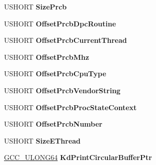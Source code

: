 \begin{DoxyCompactItemize}
U\+S\+H\+O\+RT {\bfseries Size\+Prcb}
\item 
\mbox{\label{struct___k_d_d_e_b_u_g_g_e_r___d_a_t_a64_a4b52d7c1379319af666cc3b134f54955}} 
U\+S\+H\+O\+RT {\bfseries Offset\+Prcb\+Dpc\+Routine}
\item 
\mbox{\label{struct___k_d_d_e_b_u_g_g_e_r___d_a_t_a64_a92a463bfddea18ec7218fb84c51f1bef}} 
U\+S\+H\+O\+RT {\bfseries Offset\+Prcb\+Current\+Thread}
\item 
\mbox{\label{struct___k_d_d_e_b_u_g_g_e_r___d_a_t_a64_af21f607426874dc46d8dc390b48c7b85}} 
U\+S\+H\+O\+RT {\bfseries Offset\+Prcb\+Mhz}
\item 
\mbox{\label{struct___k_d_d_e_b_u_g_g_e_r___d_a_t_a64_a4e484b436407e1cc8079c8a50c7e70c4}} 
U\+S\+H\+O\+RT {\bfseries Offset\+Prcb\+Cpu\+Type}
\item 
\mbox{\label{struct___k_d_d_e_b_u_g_g_e_r___d_a_t_a64_a9267edb48a04bac9f74144adeba09c5f}} 
U\+S\+H\+O\+RT {\bfseries Offset\+Prcb\+Vendor\+String}
\item 
\mbox{\label{struct___k_d_d_e_b_u_g_g_e_r___d_a_t_a64_a8e660e74a4b87af60fb38f8e5cd0335d}} 
U\+S\+H\+O\+RT {\bfseries Offset\+Prcb\+Proc\+State\+Context}
\item 
\mbox{\label{struct___k_d_d_e_b_u_g_g_e_r___d_a_t_a64_a4c7df5e2c9d4bc46a3a80e4d38bc9922}} 
U\+S\+H\+O\+RT {\bfseries Offset\+Prcb\+Number}
\item 
\mbox{\label{struct___k_d_d_e_b_u_g_g_e_r___d_a_t_a64_ab5e99a3003a919995cea98a76d71cec0}} 
U\+S\+H\+O\+RT {\bfseries Size\+E\+Thread}
\item 
\mbox{\label{struct___k_d_d_e_b_u_g_g_e_r___d_a_t_a64_ac43ddf11e86403bb847d031c931b364d}} 
\hyperlink{union___g_c_c___u_l_o_n_g64}{G\+C\+C\+\_\+\+U\+L\+O\+N\+G64} {\bfseries Kd\+Print\+Circular\+Buffer\+Ptr}

\end{DoxyCompactItemize}
